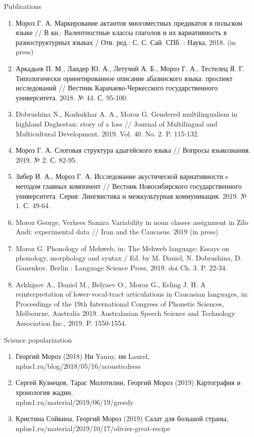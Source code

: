 \documentclass{resume} %
\begin{document}
\begin{rSection}{Publications}
\begin{enumerate}
\item Мороз Г. А. Маркирование актантов многоместных предикатов в польском языке // В кн.: Валентностные классы глаголов и их вариативность в разноструктурных языках / Отв. ред.: С. С. Сай. СПб. : Наука, 2018. (in press)
\item Аркадьев П. М., Ландер Ю. А., Летучий А. Б., Мороз Г. А., Тестелец Я. Г. Типологически ориентированное описание абазинского языка: проспект исследований // Вестник Карачаево-Черкесского государственного университета. 2018. № 44. С. 95-100.
\item  Dobrushina N., Kozhukhar A. A., Moroz G. Gendered multilingualism in highland Daghestan: story of a loss // Journal of Multilingual and Multicultural Development. 2019. Vol. 40. No. 2. P. 115-132.
\item Мороз Г. А. Слоговая структура адыгейского языка // Вопросы языкознания. 2019. № 2. С. 82-95.
\item  Зибер И. А., Мороз Г. А. Исследование акустической вариативности s методом главных компонент // Вестник Новосибирского государственного университета. Серия: Лингвистика и межкультурная коммуникация. 2019. № 1. С. 49-64.
\item Moroz George, Verhees Samira Variability in noun classes assignment in Zilo Andi: experimental data // Iran and the Caucasus. 2019 (in press)
\item  Moroz G. Phonology of Mehweb, in: The Mehweb language: Essays on phonology, morphology and syntax / Ed. by M. Daniel, N. Dobrushina, D. Ganenkov. Berlin : Language Science Press, 2019. doi Ch. 3. P. 22-34.
\item Arkhipov A., Daniel M., Belyaev O., Moroz G., Esling J. H. A reinterpretation of lower-vocal-tract articulations in Caucasian languages, in: Proceedings of the 19th International Congress of Phonetic Sciences, Melbourne, Australia 2019. Australasian Speech Science and Technology Association Inc., 2019. P. 1550-1554.
\end{enumerate}
\end{rSection}

\begin{rSection}{Science popularization}
\begin{enumerate}
\item Георгий Мороз (2018)  Ни Yanny, ни Laurel, \\ nplus1.ru/blog/2018/05/16/acousticdress
\item Сергей Кузнецов, Тарас Молотилин, Георгий Мороз (2019) Картография и хронология жадин, \\ nplus1.ru/material/2019/06/19/greedy
\item Кристина Сойкина, Георгий Мороз (2019) Салат для большой страны, \\ nplus1.ru/material/2019/10/17/olivier-great-recipe
\end{enumerate}
\end{rSection}
\end{document}
